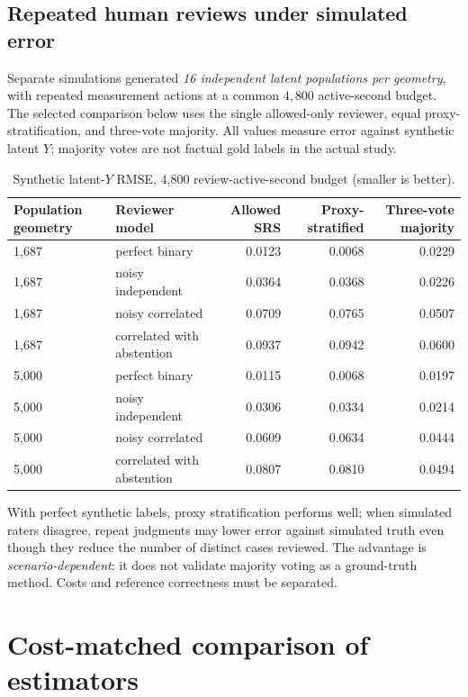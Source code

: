 \documentclass[11pt,a4paper]{article}
\begin{document}
\subsection{Repeated human reviews under simulated error}
Separate simulations generated \emph{16 independent latent populations per geometry}, with repeated measurement actions at a common $4{,}800$ active-second budget. The selected comparison below uses the single allowed-only reviewer, equal proxy-stratification, and three-vote majority. All values measure error against synthetic latent $Y$; majority votes are not factual gold labels in the actual study.
\begin{table}[H]\centering\scriptsize
\caption{Synthetic latent-$Y$ RMSE, 4,800 review-active-second budget (smaller is better).}
\begin{tabular}{@{}llrrr@{}}\toprule
Population geometry & Reviewer model & Allowed SRS & Proxy-stratified & Three-vote majority\\\midrule
1,687 & perfect binary & 0.0123 & 0.0068 & 0.0229 \\
1,687 & noisy independent & 0.0364 & 0.0368 & 0.0226 \\
1,687 & noisy correlated & 0.0709 & 0.0765 & 0.0507 \\
1,687 & correlated with abstention & 0.0937 & 0.0942 & 0.0600 \\
5,000 & perfect binary & 0.0115 & 0.0068 & 0.0197 \\
5,000 & noisy independent & 0.0306 & 0.0334 & 0.0214 \\
5,000 & noisy correlated & 0.0609 & 0.0634 & 0.0444 \\
5,000 & correlated with abstention & 0.0807 & 0.0810 & 0.0494 \\
\bottomrule\end{tabular}
\end{table}
With perfect synthetic labels, proxy stratification performs well; when simulated raters disagree, repeat judgments may lower error against simulated truth even though they reduce the number of distinct cases reviewed. The advantage is \emph{scenario-dependent}: it does not validate majority voting as a ground-truth method. Costs and reference correctness must be separated.

\section{Cost-matched comparison of estimators}
\end{document}
